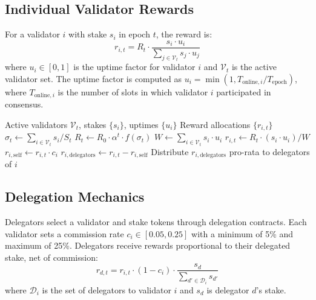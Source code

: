 \subsection{Individual Validator Rewards}

For a validator $i$ with stake $s_i$ in epoch $t$, the reward is:
\begin{equation}
    r_{i,t} = R_t \cdot \frac{s_i \cdot u_i}{\sum_{j \in \mathcal{V}_t} s_j \cdot u_j}
\end{equation}
where $u_i \in [0,1]$ is the uptime factor for validator $i$ and $\mathcal{V}_t$ is the active validator set. The uptime factor is computed as $u_i = \min(1, T_{\text{online},i} / T_{\text{epoch}})$, where $T_{\text{online},i}$ is the number of slots in which validator $i$ participated in consensus.

\begin{algorithm}[H]
\caption{Per-Epoch Reward Distribution}
\label{alg:reward}
\begin{algorithmic}[1]
\Require Active validators $\mathcal{V}_t$, stakes $\{s_i\}$, uptimes $\{u_i\}$
\Ensure Reward allocations $\{r_{i,t}\}$
\State $\sigma_t \gets \sum_{i \in \mathcal{V}_t} s_i / S_t$
\State $R_t \gets R_0 \cdot \alpha^t \cdot f(\sigma_t)$
\State $W \gets \sum_{i \in \mathcal{V}_t} s_i \cdot u_i$
    \State $r_{i,t} \gets R_t \cdot (s_i \cdot u_i) / W$
    \State $r_{i,\text{self}} \gets r_{i,t} \cdot c_i$ 
    \State $r_{i,\text{delegators}} \gets r_{i,t} - r_{i,\text{self}}$ 
    \State Distribute $r_{i,\text{delegators}}$ pro-rata to delegators of $i$
\EndFor
\end{algorithmic}
\end{algorithm}

\subsection{Delegation Mechanics}

Delegators select a validator and stake tokens through delegation contracts. Each validator sets a commission rate $c_i \in [0.05, 0.25]$ with a minimum of 5\% and maximum of 25\%. Delegators receive rewards proportional to their delegated stake, net of commission:
\begin{equation}
    r_{d,t} = r_{i,t} \cdot (1 - c_i) \cdot \frac{s_d}{\sum_{d' \in \mathcal{D}_i} s_{d'}}
\end{equation}
where $\mathcal{D}_i$ is the set of delegators to validator $i$ and $s_d$ is delegator $d$'s stake.

